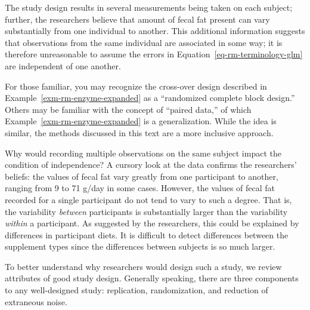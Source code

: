\documentclass[
  letterpaper,
  DIV=11,
  numbers=noendperiod]{scrreprt}
\theoremstyle{definition}
\theoremstyle{definition}
\theoremstyle{remark}
\begin{document}
The study design results in several measurements being taken on each
subject; further, the researchers believe that amount of fecal fat
present can vary substantially from one individual to another. This
additional information suggests that observations from the same
individual are associated in some way; it is therefore unreasonable to
assume the errors in Equation~\ref{eq-rm-terminology-glm} are
independent of one another.

\begin{tcolorbox}[enhanced jigsaw, bottomrule=.15mm, titlerule=0mm, bottomtitle=1mm, colback=white, coltitle=black, rightrule=.15mm, leftrule=.75mm, toprule=.15mm, toptitle=1mm, left=2mm, opacityback=0, colframe=quarto-callout-note-color-frame, breakable, title=\textcolor{quarto-callout-note-color}{\faInfo}\hspace{0.5em}{Note}, arc=.35mm, colbacktitle=quarto-callout-note-color!10!white, opacitybacktitle=0.6]

For those familiar, you may recognize the cross-over design described in
Example~\ref{exm-rm-enzyme-expanded} as a ``randomized complete block
design.'' Others may be familiar with the concept of ``paired data,'' of
which Example~\ref{exm-rm-enzyme-expanded} is a generalization. While
the idea is similar, the methods discussed in this text are a more
inclusive approach.

\end{tcolorbox}

Why would recording multiple observations on the same subject impact the
condition of independence? A cursory look at the data confirms the
researchers' beliefs: the values of fecal fat vary greatly from one
participant to another, ranging from 9 to 71 g/day in some cases.
However, the values of fecal fat recorded for a single participant do
not tend to vary to such a degree. That is, the variability
\emph{between} participants is substantially larger than the variability
\emph{within} a participant. As suggested by the researchers, this could
be explained by differences in participant diets. It is difficult to
detect differences between the supplement types since the differences
between subjects is so much larger.

To better understand why researchers would design such a study, we
review attributes of good study design. Generally speaking, there are
three components to any well-designed study: replication, randomization,
and reduction of extraneous noise.
\end{document}
